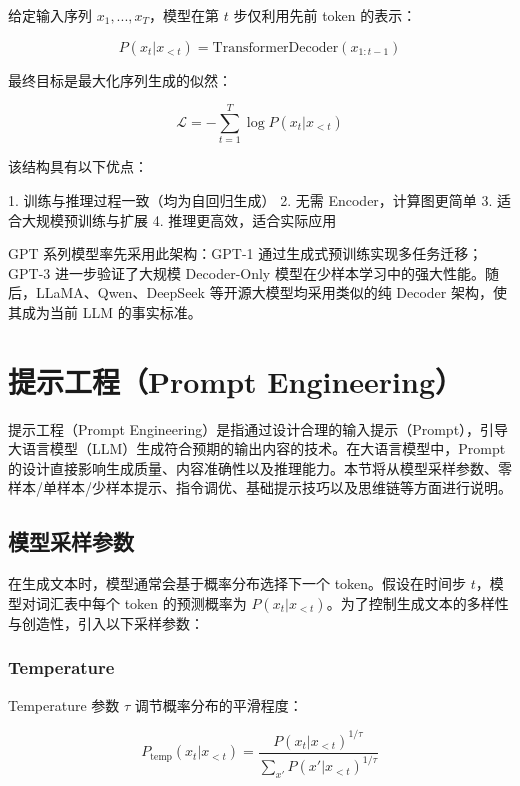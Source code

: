\documentclass[professional,privacy,print,win,long,STEM,AutoFakeBold]{def/buaa}
\begin{document}
给定输入序列 $x_1, ..., x_T$，模型在第 $t$ 步仅利用先前 token 的表示：

\begin{equation}
P(x_t|x_{<t}) = \text{TransformerDecoder}(x_{1:t-1})
\end{equation}

最终目标是最大化序列生成的似然：

\begin{equation}
\mathcal{L} = -\sum_{t=1}^{T} \log P(x_t | x_{<t})
\end{equation}

该结构具有以下优点：

1. 训练与推理过程一致（均为自回归生成）
2. 无需 Encoder，计算图更简单
3. 适合大规模预训练与扩展
4. 推理更高效，适合实际应用

GPT 系列模型率先采用此架构：GPT-1 通过生成式预训练实现多任务迁移；GPT-3 进一步验证了大规模 Decoder-Only 模型在少样本学习中的强大性能。随后，LLaMA、Qwen、DeepSeek 等开源大模型均采用类似的纯 Decoder 架构，使其成为当前 LLM 的事实标准。
\section{提示工程（Prompt Engineering）}

提示工程（Prompt Engineering）是指通过设计合理的输入提示（Prompt），引导大语言模型（LLM）生成符合预期的输出内容的技术。在大语言模型中，Prompt 的设计直接影响生成质量、内容准确性以及推理能力。本节将从模型采样参数、零样本/单样本/少样本提示、指令调优、基础提示技巧以及思维链等方面进行说明。

\subsection{模型采样参数}

在生成文本时，模型通常会基于概率分布选择下一个 token。假设在时间步 $t$，模型对词汇表中每个 token 的预测概率为 $P(x_t|x_{<t})$。为了控制生成文本的多样性与创造性，引入以下采样参数：

\subsubsection{Temperature}

Temperature 参数 $\tau$ 调节概率分布的平滑程度：

\begin{equation}
P_\text{temp}(x_t|x_{<t}) = \frac{P(x_t|x_{<t})^{1/\tau}}{\sum_{x'} P(x'|x_{<t})^{1/\tau}}
\end{equation}
\end{document}
